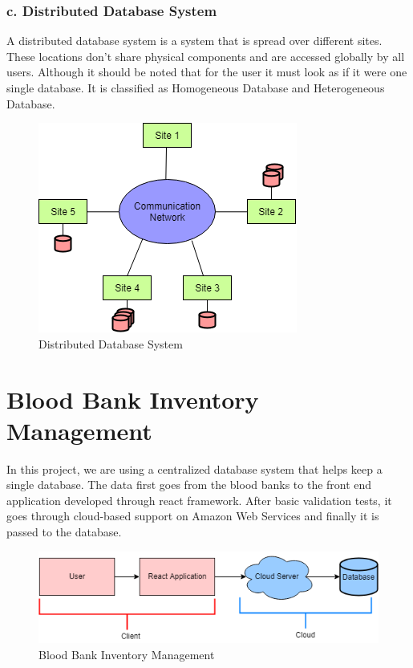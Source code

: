 \documentclass[BTech]{srmuthesis}
\begin{document}
\subsubsection{c. Distributed Database System}
A distributed database system is a system that is spread over different sites. These locations don’t share physical components and are accessed globally by all users. Although it should be noted that for the user it must look as if it were one single database. It is classified as Homogeneous Database and Heterogeneous Database.
\begin{figure}[h!]
	\centering
	\includegraphics[scale=0.7]{DistributedDBMS.png}
	\caption{Distributed Database System}
\end{figure}
\section{Blood Bank Inventory Management}
In this project, we are using a centralized database system that helps keep a single database. The data first goes from the blood banks to the front end application developed through react framework. After basic validation tests, it goes through cloud-based support on Amazon Web Services and finally it is passed to the database.
\begin{figure}[h!]
	\centering
	\includegraphics[scale=0.7]{BBInventoryManagement.png}
	\caption{Blood Bank Inventory Management}
\end{figure}
\end{document}
